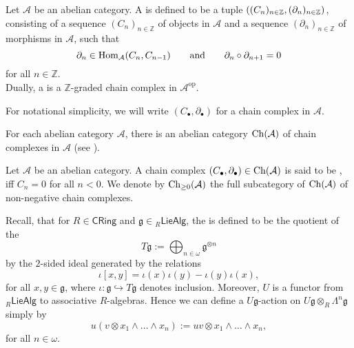 \begin{definition}
	Let $\mathcal{A}$ be an abelian category. A  is defined to be a tuple $\del[0]{(C_n)_{n \in \mathbb{Z}},(\partial_n)_{n \in \mathbb{Z}}}$, consisting of a sequence $(C_n)_{n \in \mathbb{Z}}$ of objects in $\mathcal{A}$ and a sequence $(\partial_n)_{n \in \mathbb{Z}}$ of morphisms in $\mathcal{A}$, such that 
	\begin{equation*}
		\partial_n \in \operatorname{Hom}_\mathcal{A}(C_n,C_{n - 1}) \qquad \text{and} \qquad \partial_n \circ \partial_{n + 1} = 0
	\end{equation*}
	\noindent for all $n \in \mathbb{Z}$.\\
	Dually, a  is a $\mathbb{Z}$-graded chain complex in $\mathcal{A}^\mathrm{op}$. 
\end{definition}

\begin{remark}
	For notational simplicity, we will write $(C_\bullet,\partial_\bullet)$ for a chain complex in $\mathcal{A}$.
\end{remark}

\begin{remark}
	For each abelian category $\mathcal{A}$, there is an abelian category $\operatorname{Ch}(\mathcal{A})$ of chain complexes in $\mathcal{A}$ (see \cite[7]{weibel:homological_algebra:1994}).
\end{remark}

\begin{definition}
	Let $\mathcal{A}$ be an abelian category. A chain complex $(C_\bullet,\partial_\bullet) \in \operatorname{Ch}(\mathcal{A})$ is said to be , iff $C_n = 0$ for all $n < 0$. We denote by $\operatorname{Ch}_{\geq 0}(\mathcal{A})$ the full subcategory of $\operatorname{Ch}(\mathcal{A})$ of non-negative chain complexes.
\end{definition}

Recall, that for $R \in \mathsf{CRing}$ and $\mathfrak{g} \in {_{R}\mathsf{LieAlg}}$, the  is defined to be the quotient of the 
\begin{equation*}
	T\mathfrak{g} := \bigoplus_{n \in \omega} \mathfrak{g}^{\otimes n}
\end{equation*}
\noindent by the $2$-sided ideal generated by the relations
\begin{equation*}
	\iota[x,y] = \iota(x)\iota(y) - \iota(y)\iota(x),
\end{equation*}
\noindent for all $x,y \in \mathfrak{g}$, where $\iota : \mathfrak{g} \hookrightarrow T\mathfrak{g}$ denotes inclusion. Moreover, $U$ is a functor from $_{R}\mathsf{LieAlg}$ to associative $R$-algebras. Hence we can define a $U\mathfrak{g}$-action on $U\mathfrak{g} \otimes_R \Lambda^n \mathfrak{g}$ simply by
\begin{equation*}
	u(v \otimes x_1 \wedge \dots \wedge x_n) := uv \otimes x_1 \wedge \dots \wedge x_n,
\end{equation*}
\noindent for all $n \in \omega$.

